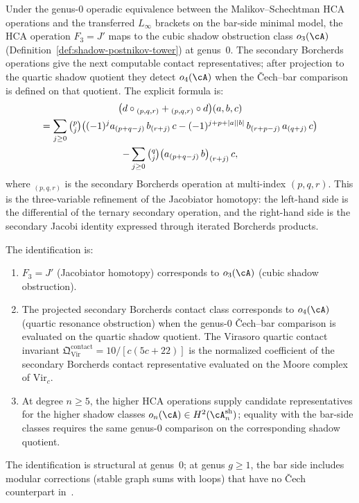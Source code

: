 \begin{proposition}
\label{prop:borcherds-shadow-identification}
Under the genus-$0$ operadic equivalence between the
Malikov--Schechtman HCA operations and the transferred
$L_\infty$ brackets on the bar-side minimal model, the HCA
operation $F_3=J'$ maps to the cubic shadow obstruction class
$o_3(\cA)$
\textup{(}Definition~\textup{\ref{def:shadow-postnikov-tower})}
at genus~$0$.  The secondary Borcherds operations give the next
computable contact representatives; after projection to the quartic
shadow quotient they detect $o_4(\cA)$ when the \v{C}ech--bar
comparison is defined on that quotient.  The explicit formula
\cite[formula~(4.5.1)]{MS24} is:
\begin{multline}\label{eq:secondary-borcherds-explicit}
 \bigl(d \circ {}_{(p,q,r)} + {}_{(p,q,r)} \circ d\bigr)(a,b,c) \\
 = \sum_{j \geq 0}\tbinom{p}{j}
 \bigl((-1)^j a_{(p+q-j)}\, b_{(r+j)}\, c
 - (-1)^{j+p+|a||b|}\, b_{(r+p-j)}\, a_{(q+j)}\, c\bigr) \\
 - \sum_{j \geq 0}\tbinom{q}{j}
 \bigl(a_{(p+q-j)}\, b\bigr)_{(r+j)}\, c,
\end{multline}
where ${}_{(p,q,r)}$ is the secondary Borcherds operation at
multi-index $(p,q,r)$. This is the three-variable refinement of the
Jacobiator homotopy: the left-hand side is the differential of the
ternary secondary operation, and the right-hand side is the secondary
Jacobi identity expressed through iterated Borcherds products.

The identification is:
\begin{enumerate}[label=\textup{(\roman*)}]
\item $F_3 = J'$ \textup{(}Jacobiator homotopy\textup{)}
 corresponds to $o_3(\cA)$ \textup{(}cubic shadow obstruction\textup{)}.
\item The projected secondary Borcherds contact class corresponds to
 $o_4(\cA)$ \textup{(}quartic resonance obstruction\textup{)} when the
 genus-$0$ \v{C}ech--bar comparison is evaluated on the quartic shadow
 quotient. The Virasoro quartic contact invariant
 $\mathfrak{Q}^{\mathrm{contact}}_{\mathrm{Vir}} = 10/[c(5c+22)]$
 is the normalized coefficient of the secondary Borcherds
 contact representative evaluated on the Moore complex of
 $\mathrm{Vir}_c$.
\item At degree $n \geq 5$, the higher HCA operations supply
 candidate representatives for the higher shadow classes
 $o_n(\cA) \in H^2(\cA^{\mathrm{sh}}_n)$; equality with the
 bar-side classes requires the same genus-$0$ comparison on the
 corresponding shadow quotient.
\end{enumerate}
The identification is structural at genus~$0$; at genus $g \geq 1$,
the bar side includes modular corrections (stable graph sums with
loops) that have no \v{C}ech counterpart in~\cite{MS24}.
\end{proposition}


